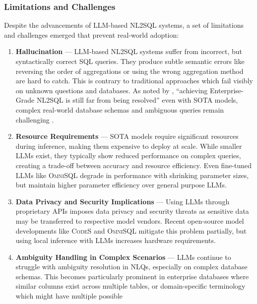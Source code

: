 \subsubsection{Limitations and Challenges}

Despite the advancements of LLM-based NL2SQL systems, a set of limitations and
challenges emerged that prevent real-world adoption:

\begin{enumerate}
    \item \textbf{Hallucination} — LLM-based NL2SQL systems suffer from
        incorrect, but syntactically correct SQL queries. They produce subtle
        semantic errors like reversing the order of aggregations or using the
        wrong aggregation method are hard to catch. This is contrary to
        traditional approaches which fail visibly on unknown questions and
        databases. As noted by \citeauthor{NL2SQLUnsolved}, ``achieving
        Enterprise-Grade NL2SQL is still far from being resolved'' even with
        SOTA models, complex real-world database schemas and ambiguous queries
        remain challenging \citep{NL2SQLUnsolved, Spider2}.
    \item \textbf{Resource Requirements} — SOTA models require
        significant resources during inference, making them
        expensive to deploy at scale. While smaller LLMs exist, they
        typically show reduced performance on complex queries, creating a
        trade-off between accuracy and resource efficiency. Even fine-tuned
        LLMs like \textsc{OmniSQL} degrade in performance with shrinking
        parameter sizes, but maintain higher parameter efficiency over
        general purpose LLMs.
    \item \textbf{Data Privacy and Security Implications} — Using LLMs through
        proprietary APIs imposes data privacy and security threats as sensitive
        data may be transferred to respective model vendors. Recent open-source
        model developments like \textsc{CodeS} and \textsc{OmniSQL} mitigate
        this problem partially, but using local inference with LLMs increases
        hardware requirements.
    \item \textbf{Ambiguity Handling in Complex Scenarios} — LLMs continue to
        struggle with ambiguity resolution in NLQs, especially on complex
        database schemas. This becomes particularly prominent in enterprise
        databases where similar columns exist across multiple tables, or
        domain-specific terminology which might have multiple possible

\end{enumerate}
